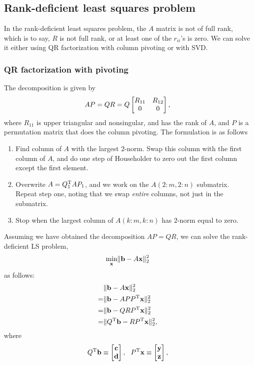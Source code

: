 \documentclass{article}
\begin{document}
\subsection{Rank-deficient least squares problem}
In the rank-deficient least squares problem, the $A$ matrix is not of full rank, which is to say, $R$ is not full rank, or at least one of the $r_{ii}$'s is zero. We can solve it either using QR factorization with column pivoting or with SVD.

\subsubsection{QR factorization with pivoting}
The decomposition is given by
\begin{equation}
    AP=QR=Q\begin{bmatrix}{R_{11}}&{R_{12}}\\{0}&{0}\end{bmatrix},
\end{equation}
where $R_{11}$ is upper triangular and nonsingular, and has the rank of $A$, and $P$ is a permutation matrix that does the column pivoting. The formulation is as follows
\begin{enumerate}
    \item Find column of $A$ with the largest $2$-norm. Swap this column with the first column of $A$, and do one step of Householder to zero out the first column except the first element.
    \item Overwrite $A=Q_1^{\text{T}} AP_1$, and we work on the $A(2:m,2:n)$ submatrix. Repeat step one, noting that we swap \textit{entire} columns, not just in the submatrix.
    \item Stop when the largest column of $A(k:m,k:n)$ has $2$-norm equal to zero.
\end{enumerate}
Assuming we have obtained the decomposition $AP=QR$, we can solve the rank-deficient LS problem,
\begin{equation}
    \min_{\bm{\mathrm{x}}}\lVert \bm{\mathrm{b}}-A\bm{\mathrm{x}}\rVert_2^2
\end{equation}
as follows:
\begin{align}
    &\lVert \bm{\mathrm{b}}-A\bm{\mathrm{x}}\rVert_2^2\\
    =&\lVert \bm{\mathrm{b}}-APP^{\text{T}}\bm{\mathrm{x}}\rVert_2^2\\
    =&\lVert \bm{\mathrm{b}}-QRP^{\text{T}}\bm{\mathrm{x}}\rVert_2^2\\
    =&\lVert Q^{\text{T}}\bm{\mathrm{b}}-RP^{\text{T}}\bm{\mathrm{x}}\rVert_2^2,
\end{align}
where
\begin{equation}
    Q\tp\bvec{b}\equiv\tvec{\bvec{c}}{\bvec{d}},\ \ P\tp\bvec{x}\equiv\tvec{\bvec{y}}{\bvec{z}},
\end{equation}
\end{document}
